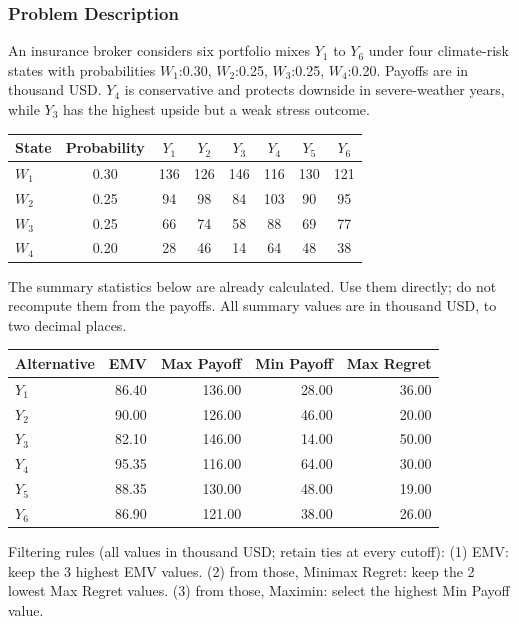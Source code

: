 \subsubsection*{Problem Description}
An insurance broker considers six portfolio mixes $Y_1$ to $Y_6$ under four climate-risk states with probabilities $W_1$:0.30, $W_2$:0.25, $W_3$:0.25, $W_4$:0.20.
Payoffs are in thousand USD. $Y_4$ is conservative and protects downside in severe-weather years, while $Y_3$ has the highest upside but a weak stress outcome.
\begin{center}
	\begin{tabular}{l c c c c c c c}
		\toprule
		State & Probability & $Y_1$ & $Y_2$ & $Y_3$ & $Y_4$ & $Y_5$ & $Y_6$ \\
		\midrule
		$W_1$ & 0.30 & 136 & 126 & 146 & 116 & 130 & 121 \\
		$W_2$ & 0.25 & 94 & 98 & 84 & 103 & 90 & 95 \\
		$W_3$ & 0.25 & 66 & 74 & 58 & 88 & 69 & 77 \\
		$W_4$ & 0.20 & 28 & 46 & 14 & 64 & 48 & 38 \\
		\bottomrule
	\end{tabular}
\end{center}
The summary statistics below are already calculated. Use them directly; do not recompute them from the payoffs. All summary values are in thousand USD, to two decimal places.
\begin{center}
\begin{tabular}{lrrrr}
\toprule
Alternative & EMV & Max Payoff & Min Payoff & Max Regret \\
\midrule
$Y_1$ & 86.40 & 136.00 & 28.00 & 36.00 \\
$Y_2$ & 90.00 & 126.00 & 46.00 & 20.00 \\
$Y_3$ & 82.10 & 146.00 & 14.00 & 50.00 \\
$Y_4$ & 95.35 & 116.00 & 64.00 & 30.00 \\
$Y_5$ & 88.35 & 130.00 & 48.00 & 19.00 \\
$Y_6$ & 86.90 & 121.00 & 38.00 & 26.00 \\
\bottomrule
\end{tabular}
\end{center}
Filtering rules (all values in thousand USD; retain ties at every cutoff):
(1) EMV: keep the 3 highest EMV values.
(2) from those, Minimax Regret: keep the 2 lowest Max Regret values.
(3) from those, Maximin: select the highest Min Payoff value.


